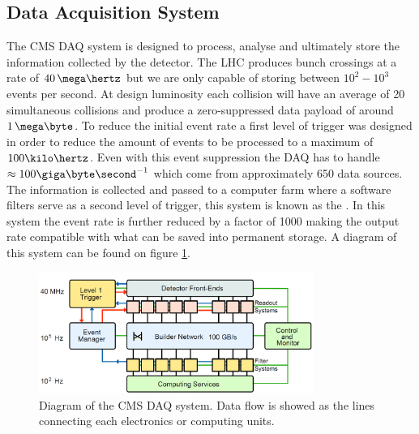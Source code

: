 \subsection{Data Acquisition System}
\label{SUBSECTION:ExperimentalApparatus_CMS_DAQ}


The \gls{CMS} \gls{DAQ} system is designed to process, analyse and ultimately store the information collected by the detector. The \gls{LHC} produces bunch crossings at a rate of $40\,\mega\hertz$ but we are only capable of storing between $10^2-10^3$ events per second. At design luminosity each collision will have an average of 20 simultaneous collisions and produce a zero-suppressed data payload of around $1\,\mega\byte$. To reduce the initial event rate a first level of trigger was designed in order to reduce the amount of events to be processed to a maximum of $100 \kilo\hertz$. Even with this event suppression the \gls{DAQ} has to handle $\approx 100 \giga\byte\second^{-1}$ which come from approximately 650 data sources. The information is collected and passed to a computer farm where a software filters serve as a second level of trigger, this system is known as the . In this system the event rate is further reduced by a factor of 1000 making the output rate compatible with what can be saved into permanent storage. A diagram of this system can be found on figure \ref{FIGURE:ExperimentalApparatus_CMS_DAQ_Diagram}.

\begin{figure}[!htb]
  \centering
  \includegraphics[width=0.80\textwidth]{Chapter02/CMS/Images/CMS_DAQ_Diagram.png}
  \caption{Diagram of the \gls{CMS} \gls{DAQ} system. Data flow is showed as the lines connecting each electronics or computing units.}
  \label{FIGURE:ExperimentalApparatus_CMS_DAQ_Diagram}
\end{figure}

